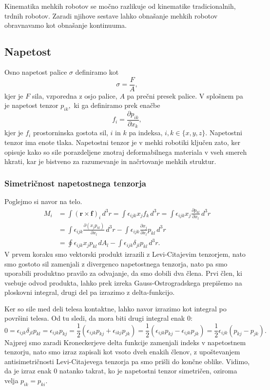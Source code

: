 \documentclass[12pt ]{article}
\begin{document}
Kinematika mehkih robotov se močno razlikuje od kinematike tradicionalnih, trdnih robotov. Zaradi njihove sestave lahko obnašanje mehkih robotov obravnavamo kot obnašanje kontinuuma\cite{rus2015design}.

\subsection{Napetost}
Osno napetost palice $\sigma$ definiramo kot $$\sigma=\frac{F}{A},$$ kjer je $F$ sila, vzporedna z osjo palice, $A$ pa prečni presek palice. V splošnem pa je napetost tenzor $p_{ik},$ ki ga definiramo prek enačbe $$f_i=\frac{\partial p_{ik}}{\partial x_k},$$ kjer je $f_i$ prostorninska gostota sil, $i$ in $k$ pa indeksa, $i,k\in\{x,y,z\}$. Napetostni tenzor ima enote tlaka. Napetostni tenzor je v mehki robotiki ključen zato, ker opisuje kako so sile porazdeljene znotraj deformabilnega materiala v vseh smereh hkrati, kar je bistveno za razumevanje in načrtovanje mehkih struktur.

\subsubsection{Simetričnost napetostnega tenzorja}
Poglejmo si navor na telo.
\begin{align*}
M_i &= \int (\mathbf r \times \mathbf f)_i \, d^3 r
     = \int \epsilon_{ijk} x_j f_k \, d^3 r
     = \int \epsilon_{ijk} x_j \frac{\partial p_{kl}}{\partial x_l} \, d^3 r \\
&= \int \epsilon_{ijk} \frac{\partial (x_j p_{kl})}{\partial x_l} \, d^3 r
   - \int \epsilon_{ijk} \frac{\partial x_j}{\partial x_l} p_{kl} \, d^3 r \\
&= \oint \epsilon_{ijk} x_j p_{kl} \, dA_l
   - \int \epsilon_{ijk} \delta_{jl} p_{kl} \, d^3 r .
\end{align*}
V prvem koraku smo vektorski produkt izrazili z Levi-Citajevim tenzorjem, nato smo gostoto sil zamenjali z divergenco napetostnega tenzorja, nato pa smo uporabili produktno pravilo za odvajanje, da smo dobili dva člena. Prvi člen, ki vsebuje odvod produkta, lahko prek izreka Gauss-Ostrogradskega prepišemo na ploskovni integral, drugi del pa izrazimo z delta-funkcijo.

Ker so sile med deli telesa kontaktne, lahko navor izrazimo kot integral po površini telesa. Od tu sledi, da mora biti drugi integral enak 0: $$0=\epsilon_{ijk}\delta_{jl}p_{kl}=\epsilon_{ijk}p_{kj}=\frac{1}{2}(\epsilon_{ijk}p_{kj}+\epsilon_{ikj}p_{jk})=\frac{1}{2}(\epsilon_{ijk}p_{kj}-\epsilon_{ijk}p_{jk})=\frac{1}{2}\epsilon_{ijk}(p_{kj}-p_{jk}).$$
Najprej smo zaradi Kroneckerjeve delta funkcije zamenjali indeks v napetostnem tenzorju, nato smo izraz zapisali kot vsoto dveh enakih členov, z upoštevanjem antisimetričnosti Levi-Citajevega tenzorja pa smo prišli do končne oblike. Vidimo, da je izraz enak 0 natanko takrat, ko je napetostni tenzor simetričen, oziroma velja $p_{ik}=p_{ki}.$
\end{document}

